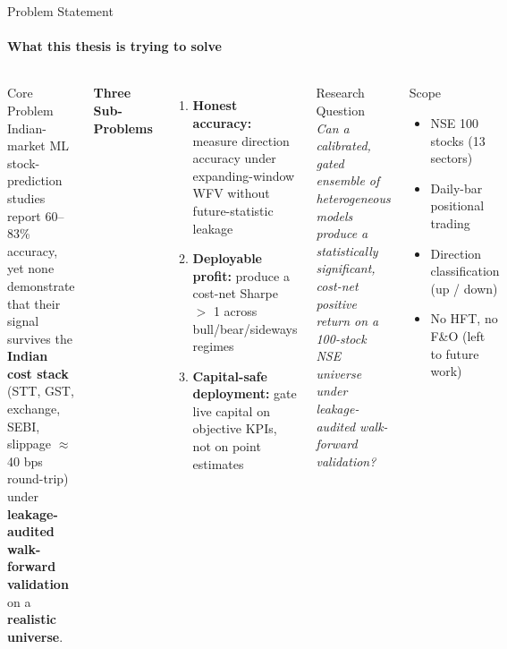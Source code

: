 \documentclass[10pt,aspectratio=43]{beamer}
\newcommand{\gd}[1]{\textcolor{secondary}{\textbf{#1}}}
\newcommand{\vsep}{\vspace{0.04cm}}
\begin{document}
\begin{frame}{Problem Statement}
  \framesubtitle{What this thesis is trying to solve}
  \begin{columns}[T]
      \begin{exampleblock}{Core Problem}
        \small
        Indian-market ML stock-prediction studies report 60--83\% accuracy, yet none demonstrate that their signal survives the \textbf{Indian cost stack} (STT, GST, exchange, SEBI, slippage $\approx$ 40 bps round-trip) under \textbf{leakage-audited walk-forward validation} on a \textbf{realistic universe}.
      \end{exampleblock}
      \vsep
      \gd{\textbf{Three Sub-Problems}}
      \begin{enumerate}\itemsep3pt\small
        \item \textbf{Honest accuracy:} measure direction accuracy under expanding-window WFV without future-statistic leakage
        \item \textbf{Deployable profit:} produce a cost-net Sharpe $>$ 1 across bull/bear/sideways regimes
        \item \textbf{Capital-safe deployment:} gate live capital on objective KPIs, not on point estimates
      \end{enumerate}
      \begin{block}{Research Question}
        \small
        \textit{Can a calibrated, gated ensemble of heterogeneous models produce a statistically significant, cost-net positive return on a 100-stock NSE universe under leakage-audited walk-forward validation?}
      \end{block}
      \vsep
      \begin{alertblock}{Scope}
        \footnotesize
        \begin{itemize}\itemsep2pt
          \item NSE 100 stocks (13 sectors)
          \item Daily-bar positional trading
          \item Direction classification (up / down)
          \item No HFT, no F\&O (left to future work)
        \end{itemize}
      \end{alertblock}
  \end{columns}
\end{frame}
\end{document}
